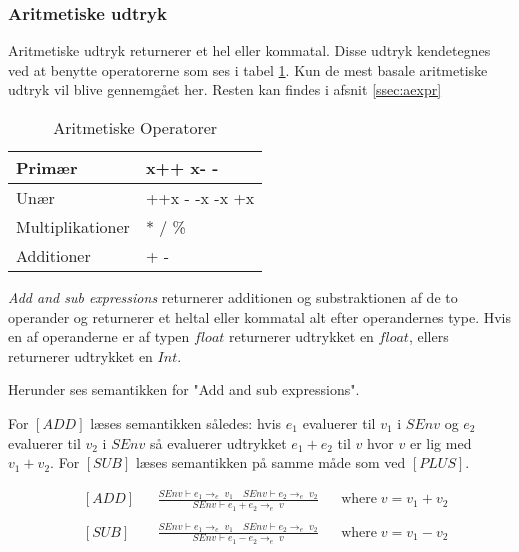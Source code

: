 \subsubsection{Aritmetiske udtryk}
Aritmetiske udtryk returnerer et hel eller kommatal. Disse udtryk kendetegnes ved at benytte operatorerne som ses i tabel \ref{tab:aritmetiskeOperatorer}. Kun de mest basale aritmetiske udtryk vil blive gennemgået her. Resten kan findes i afsnit \ref{ssec:aexpr}


\begin{table}[H]
    \centering
    \begin{tabular}{|l|l|}
        \hline
        \centering

        Primær             & x++ \quad x- -                                    \\ \hline
        Unær               & ++x \quad - -x \quad -x \quad +x                   \\ \hline
        Multiplikationer   & * \quad / \quad \%                                \\ \hline
        Additioner         & + \quad -                                         \\ \hline

    \end{tabular}
    \caption{Aritmetiske Operatorer}
    \label{tab:aritmetiskeOperatorer}
\end{table}

\textit{Add and sub expressions} returnerer additionen og substraktionen af de to operander og returnerer et heltal eller kommatal alt efter operandernes type. Hvis en af operanderne er af typen $float$ returnerer udtrykket en $float$, ellers returnerer udtrykket en $Int$.

\noindent Herunder ses semantikken for "Add and sub expressions"\mbox{}.

\noindent For $[ADD]$ læses semantikken således: hvis $e_1$ evaluerer til $v_1$ i $SEnv$ og $e_2$ evaluerer til $v_2$ i $SEnv$ så evaluerer udtrykket $e_1 + e_2$ til $v$ hvor $v$ er lig med $v_1 + v_2$.
\noindent For $[SUB]$ læses semantikken på samme måde som ved $[PLUS]$.

\begin{align*}
&[ADD] & &\frac{SEnv \vdash e_1 \rightarrow_e\; v_1\quad SEnv \vdash e_2 \rightarrow_e\; v_2}{SEnv \vdash e_1 + e_2 \rightarrow_e\; v} & &\text{where}\; v = v_1 + v_2\\\\
&[SUB] & &\frac{SEnv \vdash e_1 \rightarrow_e\; v_1\quad SEnv \vdash e_2 \rightarrow_e\; v_2}{SEnv \vdash e_1 - e_2 \rightarrow_e\; v} & &\text{where}\; v = v_1 - v_2\\\\
\end{align*}

